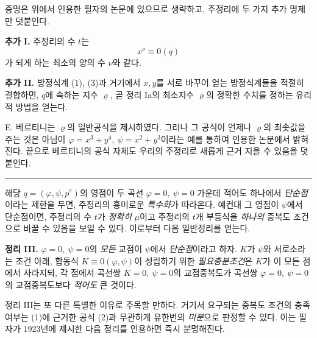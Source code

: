 증명은 위에서 인용한 필자의 논문에 있으므로 생략하고, 주정리에 두 가지 추가 명제만 덧붙인다.

\textbf{추가 I.} 주정리의 수 \(t\)는
\[
x^\nu\equiv0(q)
\]
가 되게 하는 최소의 양의 수 \(\nu\)와 같다.

\textbf{추가 II.} 방정식계 (1), (3)과 거기에서 \(x,y\)를 서로 바꾸어 얻는 방정식계들을 적절히 결합하면, \(q\)에 \glqq{}속하는\grqq{} 지수 \(\varrho\), 곧 정리 Ia의 최소지수 \(\varrho\)의 정확한 수치를 정하는 유리적 방법을 얻는다.

E. 베르티니는 \(\varrho\)의 일반공식을 제시하였다. 그러나 그 공식이 언제나 \(\varrho\)의 최솟값을 주는 것은 아님이 \(\varphi=x^3+y^4,\ \psi=x^2+y^3\)이라는 예를 통하여 인용한 논문에서 밝혀진다. 끝으로 베르티니의 공식 자체도 우리의 주정리로 새롭게 근거 지을 수 있음을 덧붙인다.

\begin{center}
\rule{4cm}{0.4pt}
\end{center}

해당 \(q=(\varphi,\psi,p^e)\)의 영점이 두 곡선 \(\varphi=0,\ \psi=0\) 가운데 적어도 하나에서 \emph{단순점}이라는 제한을 두면, 주정리의 흥미로운 \emph{특수화}가 따라온다. 예컨대 그 영점이 \(\psi\)에서 단순점이면, 주정리의 수 \(t\)가 \emph{정확히} \(\mu\)이고 주정리의 \(t\)개 부등식을 \emph{하나의} 중복도 조건으로 바꿀 수 있음을 보일 수 있다. 이로부터 다음 일반정리를 얻는다.

\textbf{정리 III.} \(\varphi=0,\ \psi=0\)의 \emph{모든} 교점이 \(\psi\)에서 \emph{단순점}이라고 하자. \(K\)가 \(\psi\)와 서로소라는 조건 아래, 합동식 \(K\equiv0(\varphi,\psi)\)이 성립하기 위한 \emph{필요충분조건}은 \(K\)가 이 모든 점에서 사라지되, 각 점에서 곡선쌍 \(K=0,\ \psi=0\)의 교점중복도가 곡선쌍 \(\varphi=0,\ \psi=0\)의 교점중복도보다 \emph{적어도} 큰 것이다.

정리 III는 또 다른 특별한 이유로 주목할 만하다. 거기서 요구되는 중복도 조건의 충족 여부는 (1)에 근거한 공식 (2)과 무관하게 유한번의 \emph{미분}으로 판정할 수 있다. 이는 필자가 1923년에 제시한 다음 \glqq{}정리\grqq{}를 인용하면 즉시 분명해진다.

